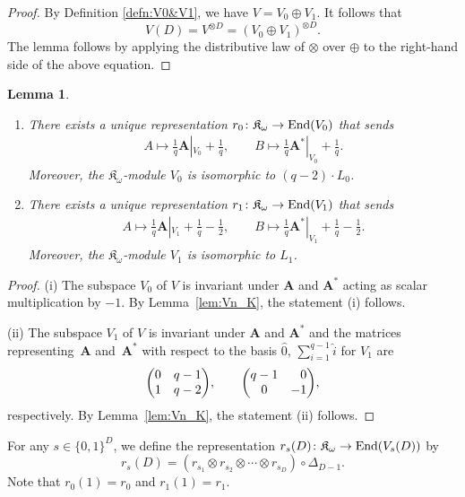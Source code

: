 \documentclass[pdftex]{sigma}%
\def\A{\mathbf A}
\def\End{{\rm End}}
\def\K{\mathfrak K_\omega}
\numberwithin{equation}{section}
\newtheorem{Lemma}[Theorem]{Lemma}
\begin{document}
\begin{proof}
By Definition \ref{defn:V0&V1}, we have $V=V_0\oplus V_1$. It follows that
\[
V(D)=V^{\otimes D}=(V_0\oplus V_1)^{\otimes D}.
\]
The lemma follows by applying the distributive law of $\otimes$ over $\oplus$ to the right-hand side of the above equation.
\end{proof}

\begin{Lemma}\label{lem:r0&r1}\quad
\begin{enumerate}\itemsep=0pt
\item[$(i)$] There exists a unique representation $r_0\colon \K\to \End(V_0)$ that sends
\begin{gather*}
A \mapsto \frac{1}{q}\A|_{V_0}+\frac{1}{q},\qquad
B \mapsto \frac{1}{q}\A^*|_{V_0}+\frac{1}{q}.
\end{gather*}
Moreover, the $\K$-module $V_0$ is isomorphic to $(q-2)\cdot L_0$.

\item[$(ii)$] There exists a unique representation $r_1\colon \K\to \End(V_1)$ that sends
\begin{gather*}
A \mapsto \frac{1}{q}\A|_{V_1}+\frac{1}{q}-\frac{1}{2},\qquad
B \mapsto \frac{1}{q}\A^*|_{V_1}+\frac{1}{q}-\frac{1}{2}.
\end{gather*}
Moreover, the $\K$-module $V_1$ is isomorphic to $L_1$.
\end{enumerate}
\end{Lemma}

\begin{proof}
(i) The subspace $V_0$ of $V$ is invariant under $\A$ and $\A^*$ acting as scalar multiplication by $-1$. By Lemma~\ref{lem:Vn_K}, the statement (i) follows.

(ii) The subspace $V_1$ of $V$ is invariant under $\A$ and $\A^*$ and the matrices representing~$\A$ and~$\A^*$ with respect to the basis $\hat 0$, $\sum_{i=1}^{q-1}\hat i$ for $V_1$ are
\[
\begin{pmatrix}
0 &q-1
\\
1 &q-2
\end{pmatrix}\!,\qquad
\begin{pmatrix}
q-1 &\hphantom{-}0
\\
0 &-1
\end{pmatrix}\!,
\]
respectively. By Lemma~\ref{lem:Vn_K}, the statement (ii) follows.
\end{proof}

\begin{Definition}\label{defn:rs(D)}
For any $s\in \{0,1\}^D$, we define the representation $r_s(D)\colon \K\to \End(V_s(D))$ by
\[
r_s(D)=(r_{s_1}\otimes r_{s_2}\otimes \cdots \otimes r_{s_D})\circ \Delta_{D-1}.
\]
Note that $r_0(1)=r_0$ and $r_1(1)=r_1$.
\end{Definition}
\end{document}
